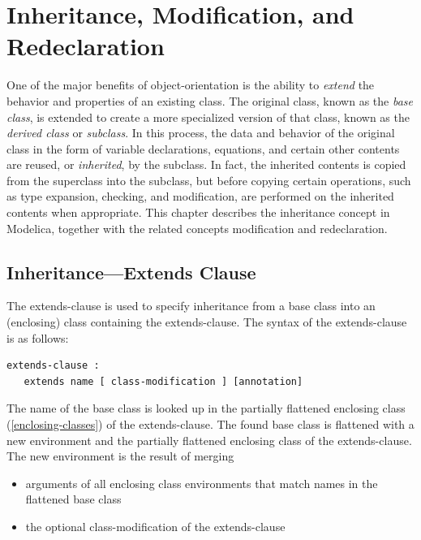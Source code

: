 \documentclass[10pt,a4paper]{report}
\def\doublelabel#1{\label{#1}\hypertarget{#1}{}}
\begin{document}
\chapter{Inheritance, Modification, and Redeclaration}\doublelabel{inheritance-modification-and-redeclaration}

One of the major benefits of object-orientation is the ability to
\emph{extend} the behavior and properties of an existing class. The
original class, known as the \emph{base class}, is extended to create a
more specialized version of that class, known as the \emph{derived
class} or \emph{subclass}. In this process, the data and behavior of the
original class in the form of variable declarations, equations, and
certain other contents are reused, or \emph{inherited}, by the subclass.
In fact, the inherited contents is copied from the superclass into the
subclass, but before copying certain operations, such as type expansion,
checking, and modification, are performed on the inherited contents when
appropriate. This chapter describes the inheritance concept in Modelica,
together with the related concepts modification and redeclaration.

\section{Inheritance---Extends Clause}\doublelabel{inheritance-extends-clause}

The extends-clause is used to specify inheritance from a base class into
an (enclosing) class containing the extends-clause. The syntax of the
extends-clause is as follows:

\begin{lstlisting}[language=grammar]
extends-clause :
   extends name [ class-modification ] [annotation]
\end{lstlisting}
The name of the base class is looked up in the partially flattened
enclosing class (\ref{enclosing-classes}) of the extends-clause. The found base
class is flattened with a new environment and the partially flattened
enclosing class of the extends-clause. The new environment is the result
of merging

\begin{itemize}
\item
  arguments of all enclosing class environments that match names in the
  flattened base class
\end{itemize}

\begin{itemize}
\item
  the optional class-modification of the extends-clause
\end{itemize}
\end{document}
